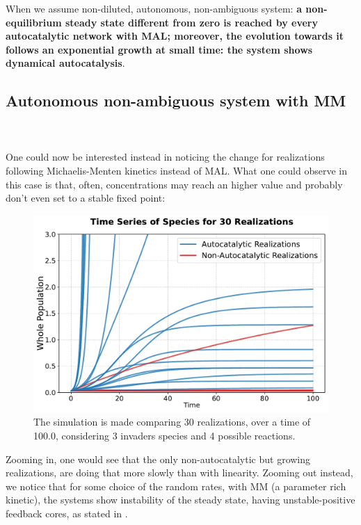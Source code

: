\documentclass{article}
\begin{document}
When we assume non-diluted, autonomous, non-ambiguous system: \textbf{a non-equilibrium steady state different from zero is reached by every autocatalytic network with MAL; moreover, the evolution towards it follows an exponential growth at small time: the system shows dynamical autocatalysis}.

\subsection{Autonomous non-ambiguous system with MM}
\\ \\
One could now be interested instead in noticing the change for realizations following Michaelis-Menten kinetics instead of MAL. What one could observe in this case is that, often, concentrations may reach an higher value and probably don't even set to a stable fixed point:

\begin{figure}[H]
    \centering
    \includegraphics[width=0.6\linewidth]{traj_elegant_MM.pdf} 
 \caption{\small{The simulation is made comparing 30 realizations, over a time of 100.0, considering 3 invaders species and 4 possible reactions.}}
   
    \label{Fig. 2a}
\end{figure}

Zooming in, one would see that the only non-autocatalytic but growing realizations, are doing that more slowly than with linearity. Zooming out instead, we notice that for some choice of the random rates, with MM (a parameter rich kinetic), the systems show instability of the steady state, having unstable-positive feedback cores, as stated in \cite{1}.
\end{document}
